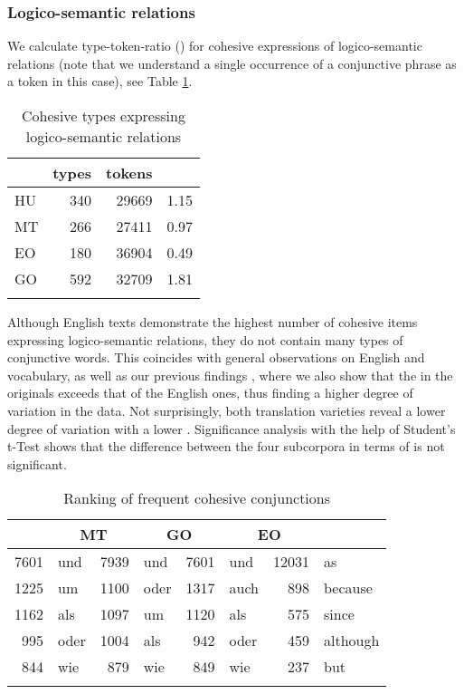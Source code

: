 \documentclass[output=paper]{langsci/langscibook.cls}
\begin{document}
\subsubsection{Logico-semantic relations}

We calculate type-token-ratio () for cohesive expressions of logico-semantic relations (note that we understand a single occurrence of a conjunctive phrase as a token in this case), see Table \ref{table:ttrlogsem}.

\begin{table}

\begin{tabular}{lrrr}
\lsptoprule
	&	types&tokens&\isi{TTR}\\
\midrule
HU	&	340&29669&1.15\\
MT	&	266&27411&0.97\\
EO	&	180&36904&0.49\\
GO	&	592&32709&1.81\\
\lspbottomrule
\end{tabular}
\caption{Cohesive types expressing logico-semantic relations}
\label{table:ttrlogsem}
\end{table}

Although English texts demonstrate the highest number of cohesive items expressing logico-semantic relations, they do not contain many types of conjunctive words. This coincides with general observations on English and  vocabulary, as well as our previous findings \citep{KunzLapshinova2014}, where we also show that the  in the  originals exceeds that of the English ones, thus finding a higher degree of variation in the  data. %
Not surprisingly, both translation varieties reveal a lower degree of variation with a lower . Significance analysis with the help of Student's t-Test shows that the difference between the four subcorpora in terms of  is not significant.

\begin{table}

\begin{tabular}{rlrlrlrl}
\lsptoprule
\multicolumn{2}{c}{\bf HT}&\multicolumn{2}{c}{\bf MT}&\multicolumn{2}{c}{\bf GO}&\multicolumn{2}{c}{\bf EO\hspace*{.5cm}}\\
\midrule
7601&und & 7939&und & 7601&und &  12031&as \\

1225&um & 1100&oder & 1317&auch & 898&because\\

1162&als & 1097&um & 1120&als & 575&since\\

995&oder & 1004&als & 942&oder & 459&although\\

844&wie & 879&wie & 849&wie & 237&but\\
\lspbottomrule
\end{tabular}
\caption{Ranking of frequent cohesive conjunctions}
\label{table:freqconj}
\end{table}
\end{document}
